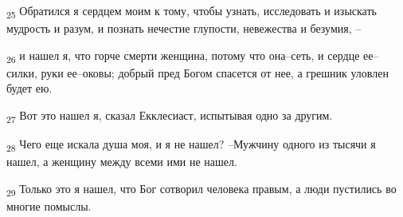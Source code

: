 \begin{tcolorbox}
\textsubscript{25} Обратился я сердцем моим к тому, чтобы узнать, исследовать и изыскать мудрость и разум, и познать нечестие глупости, невежества и безумия, --
\end{tcolorbox}
\begin{tcolorbox}
\textsubscript{26} и нашел я, что горче смерти женщина, потому что она--сеть, и сердце ее--силки, руки ее--оковы; добрый пред Богом спасется от нее, а грешник уловлен будет ею.
\end{tcolorbox}
\begin{tcolorbox}
\textsubscript{27} Вот это нашел я, сказал Екклесиаст, испытывая одно за другим.
\end{tcolorbox}
\begin{tcolorbox}
\textsubscript{28} Чего еще искала душа моя, и я не нашел? --Мужчину одного из тысячи я нашел, а женщину между всеми ими не нашел.
\end{tcolorbox}
\begin{tcolorbox}
\textsubscript{29} Только это я нашел, что Бог сотворил человека правым, а люди пустились во многие помыслы.
\end{tcolorbox}
